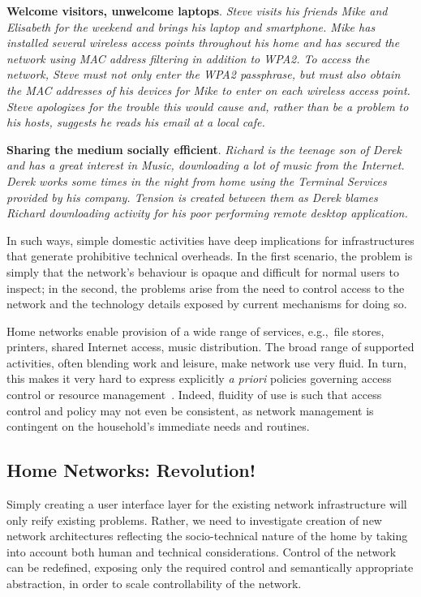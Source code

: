 \textbf{Welcome visitors, unwelcome laptops}.  {\it Steve visits his friends
  Mike and Elisabeth for the weekend and brings his laptop and smartphone.  Mike
  has installed several wireless access points throughout his home and has
  secured the network using MAC address filtering in addition to WPA2.  To
  access the network, Steve must not only enter the WPA2 passphrase, but must
  also obtain the MAC addresses of his devices for Mike to enter on each
  wireless access point.  Steve apologizes for the trouble this would cause and,
  rather than be a problem to his hosts, suggests he reads his email at a local
  cafe.} 

\textbf{Sharing the medium socially efficient}.  {\it Richard is the teenage son
  of Derek and has a great interest in Music, downloading a lot of music from the
  Internet. Derek works some times in the night from home using the Terminal
  Services provided by his company. Tension is created between them as Derek
  blames Richard downloading activity for his poor performing remote desktop
  application. } 

In such ways, simple domestic activities have deep implications for
infrastructures that generate prohibitive technical overheads.  In the first
scenario, the problem is simply that the network's behaviour is opaque and
difficult for normal users to inspect; in the second, the problems arise from
the need to control access to the network and the technology details exposed by
current mechanisms for doing so.  

Home networks enable provision of a wide range of services, e.g.,~file stores,
printers, shared Internet access, music distribution.  The broad range of
supported activities, often blending work and leisure, make network use very
fluid.  In turn, this makes it very hard to express explicitly \emph{a priori}
policies governing access control or resource management~\cite{tolmie07:_makin}.
Indeed, fluidity of use is such that access control and policy may not even be
consistent, as network management is contingent on the household's immediate
needs and routines.

\subsection{Home Networks: Revolution!} \label{s:revolution}

Simply creating a user interface layer for the existing network infrastructure
will only reify existing problems.  Rather, we need to investigate creation of
new network architectures reflecting the socio-technical nature of the home by
taking into account both human and technical considerations. Control of the
network can be redefined, exposing only the required control and semantically
appropriate abstraction, in order to scale controllability of the network.  

